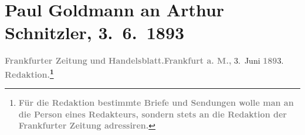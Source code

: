 

         
         \renewcommand{\erwaehntePersonen}{Personen: Richard Beer-Hofmann, Kurt Eisner, Paul Goldmann, Hugo von Hofmannsthal, Fedor Mamroth, Vally Rosengart, Josef Rosengart, August Stein}
         \renewcommand{\erwaehnteInstitutionen}{Institutionen: Frankfurter Zeitung, S. Fischer Verlag}
         \renewcommand{\erwaehnteOrte}{Orte: Berlin, Frankfurt am Main, Laupheim, Paris, Wien}
         \renewcommand{\erwaehnteWerke}{Werke: Anatol, Das Märchen. Schauspiel in drei Aufzügen, Frankfurter Zeitung, Neue Deutsche Rundschau, Sterben. Novelle}
               \section[Paul Goldmann an Arthur Schnitzler, 3. 6. 1893]{ Paul Goldmann an Arthur Schnitzler, 3. 6. 1893}\nopagebreak{}\rehead{ }\begin{ledgroupsized}[t]{13cm}\normalsize\beginnumbering{} \toendnotes[C]{\smallbreak\pagebreak[2]} 
\toendnotes[C]{\smallbreak}\pstart
           \noindent{}{\pb}\textcolor{gray}{\textbf{\textbf{Frankfurter Zeitung}}}\pend
           \pstart
           \textcolor{gray}{\textbf{und}}\pend
           \pstart
           \textcolor{gray}{\textbf{\textbf{Handelsblatt}.}}\hfill \textcolor{gray}{\textbf{Frankfurt a. M.,}}{ }3. Juni \textcolor{gray}{\textbf{189}}3.\pend
           \pstart
           \textcolor{gray}{\textbf{\textbf{Redaktion.}\footnote{\noindent{}\textcolor{gray}{\textbf{Für die Redaktion bestimmte Briefe und Sendungen wolle
                              man  an die Person eines Redakteurs,
                              sondern stets \textbf{an die Redaktion der Frankfurter Zeitung} adressiren.}}}}}\pend

\end{ledgroupsized}
